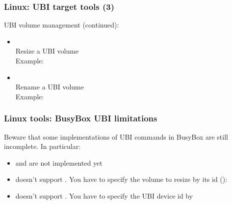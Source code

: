 \begin{frame}
  \frametitle{Linux: UBI target tools (3)}
  UBI volume management (continued):
    \begin{itemize}
    \item {\small {}}\\
	Resize a UBI volume\\
        Example: 
    \item {\small {}}\\
	Rename a UBI volume\\
        Example: 
    \end{itemize}
\end{frame}

\begin{frame}
  \frametitle{Linux tools: BusyBox UBI limitations}
  Beware that some implementations of UBI commands in BusyBox are still
  incomplete. In particular:
  \begin{itemize}
    \item {} and  are not implemented yet
    \item {} doesn't support . You have
      to specify the volume to resize by its id ():\\
    \item {} doesn't support . You
      have to specify the UBI device id by 
    \end{itemize}
\end{frame}

